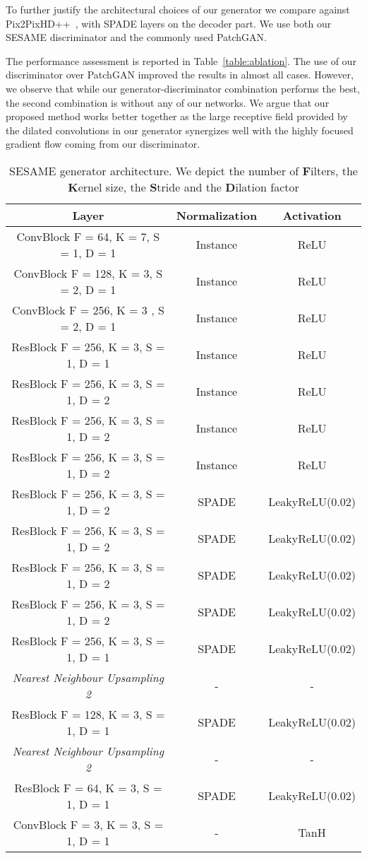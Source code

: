 \documentclass[runningheads]{llncs}
\newcommand{\tref}[1]{Table~\ref{#1}}
\begin{document}
To further justify the architectural choices of our generator we compare against Pix2PixHD++~\cite{wang2018pix2pixHD},  with SPADE layers on the decoder part. 
We use both our SESAME discriminator and the commonly used PatchGAN.

The performance assessment is reported in \tref{table:ablation}. The use of our discriminator over PatchGAN improved the results in almost all cases.
However, we observe that while our generator-discriminator combination performs the best, the second combination is without any of our networks. We argue that our proposed method works better together as the large receptive field provided by the dilated convolutions in our generator synergizes well with the highly focused gradient flow coming from our discriminator. 

\begin{table}[]
    \centering
    \caption{SESAME generator architecture. We depict the number of \textbf{F}ilters, the \textbf{K}ernel size, the \textbf{S}tride and the \textbf{D}ilation factor}
    \begin{tabular}{c|c|c}
    Layer & Normalization & Activation \\
    \hline
ConvBlock F = 64, K = 7, S = 1, D = 1 & Instance & ReLU \\
ConvBlock F = 128, K = 3, S = 2, D = 1 & Instance & ReLU \\
ConvBlock F = 256, K = 3 , S = 2, D = 1 & Instance & ReLU \\
ResBlock F = 256, K = 3, S = 1, D = 1 & Instance & ReLU \\
ResBlock F = 256, K = 3, S = 1, D = 2 & Instance & ReLU \\
ResBlock F = 256, K = 3, S = 1, D = 2 & Instance & ReLU \\
ResBlock F = 256, K = 3, S = 1, D = 2 & Instance & ReLU \\
ResBlock F = 256, K = 3, S = 1, D = 2 & SPADE & LeakyReLU(0.02) \\
ResBlock F = 256, K = 3, S = 1, D = 2 & SPADE & LeakyReLU(0.02) \\
ResBlock F = 256, K = 3, S = 1, D = 2 & SPADE & LeakyReLU(0.02) \\
ResBlock F = 256, K = 3, S = 1, D = 2 & SPADE & LeakyReLU(0.02) \\
ResBlock F = 256, K = 3, S = 1, D = 1 & SPADE & LeakyReLU(0.02) \\
\textit{Nearest Neighbour Upsampling 2} & - & - \\
ResBlock F = 128, K = 3, S = 1, D = 1 & SPADE & LeakyReLU(0.02) \\
\textit{Nearest Neighbour Upsampling 2} & - & - \\
ResBlock F = 64, K = 3, S = 1, D = 1 & SPADE & LeakyReLU(0.02) \\
ConvBlock F = 3, K = 3, S = 1, D = 1 & - & TanH \\
    \end{tabular}
    \label{tab:gen_arch}
\end{table}
\end{document}
